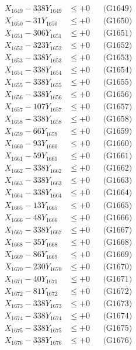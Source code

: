 \documentclass[a4paper,10pt]{article}
\begin{document}
{\begin{align}
X_{1649} - 338Y_{1649} &\leq +0 && \text{(G1649)} \\
X_{1650} - 31Y_{1650} &\leq +0 && \text{(G1650)} \\
\allowbreak
X_{1651} - 306Y_{1651} &\leq +0 && \text{(G1651)} \\
X_{1652} - 323Y_{1652} &\leq +0 && \text{(G1652)} \\
X_{1653} - 338Y_{1653} &\leq +0 && \text{(G1653)} \\
X_{1654} - 338Y_{1654} &\leq +0 && \text{(G1654)} \\
X_{1655} - 338Y_{1655} &\leq +0 && \text{(G1655)} \\
X_{1656} - 338Y_{1656} &\leq +0 && \text{(G1656)} \\
X_{1657} - 107Y_{1657} &\leq +0 && \text{(G1657)} \\
X_{1658} - 338Y_{1658} &\leq +0 && \text{(G1658)} \\
X_{1659} - 66Y_{1659} &\leq +0 && \text{(G1659)} \\
X_{1660} - 93Y_{1660} &\leq +0 && \text{(G1660)} \\
\allowbreak
X_{1661} - 59Y_{1661} &\leq +0 && \text{(G1661)} \\
X_{1662} - 338Y_{1662} &\leq +0 && \text{(G1662)} \\
X_{1663} - 338Y_{1663} &\leq +0 && \text{(G1663)} \\
X_{1664} - 338Y_{1664} &\leq +0 && \text{(G1664)} \\
X_{1665} - 13Y_{1665} &\leq +0 && \text{(G1665)} \\
X_{1666} - 48Y_{1666} &\leq +0 && \text{(G1666)} \\
X_{1667} - 338Y_{1667} &\leq +0 && \text{(G1667)} \\
X_{1668} - 35Y_{1668} &\leq +0 && \text{(G1668)} \\
X_{1669} - 86Y_{1669} &\leq +0 && \text{(G1669)} \\
X_{1670} - 230Y_{1670} &\leq +0 && \text{(G1670)} \\
\allowbreak
X_{1671} - 40Y_{1671} &\leq +0 && \text{(G1671)} \\
X_{1672} - 81Y_{1672} &\leq +0 && \text{(G1672)} \\
X_{1673} - 338Y_{1673} &\leq +0 && \text{(G1673)} \\
X_{1674} - 338Y_{1674} &\leq +0 && \text{(G1674)} \\
X_{1675} - 338Y_{1675} &\leq +0 && \text{(G1675)} \\
X_{1676} - 338Y_{1676} &\leq +0 && \text{(G1676)} \\

\end{align}}
\end{document}
